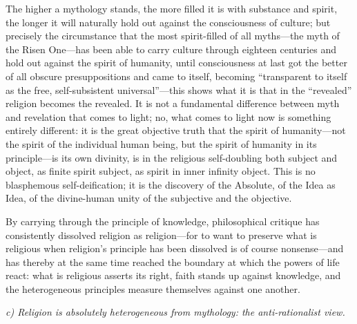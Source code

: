 \documentclass[12pt,a4paper]{article}
\begin{document}
The higher a mythology stands, the more filled it is with
substance and spirit, the longer it will naturally hold out
against the consciousness of culture; but precisely the
circumstance that the most spirit-filled of all myths---the myth
of the Risen One---has been able to carry culture through
eighteen centuries and hold out against the spirit of humanity,
until consciousness at last got the better of all obscure
presuppositions and came to itself, becoming ``transparent to
itself as the free, self-subsistent universal''---this shows
what it is that in the ``revealed'' religion becomes the
revealed. It is not a fundamental difference between myth and
revelation that comes to light; no, what comes to light now is
something entirely different: it is the great objective truth
that the spirit of humanity---not the spirit of the individual
human being, but the spirit of humanity in its principle---is
its own divinity, is in the religious self-doubling both subject
and object, as finite spirit subject, as spirit in inner
infinity object. This is no blasphemous self-deification; it is
the discovery of the Absolute, of the Idea as Idea, of the
divine-human unity of the subjective and the objective.

By carrying through the principle of knowledge, philosophical
critique has consistently dissolved religion as religion---for
to want to preserve what is religious when religion's principle
has been dissolved is of course nonsense---and has thereby at
the same time reached the boundary at which the powers of life
react: what is religious asserts its right, faith stands up
against knowledge, and the heterogeneous principles measure
themselves against one another.

\medskip
\noindent\textit{c) Religion is absolutely heterogeneous from mythology: the anti-rationalist view.}
\medskip
\end{document}
